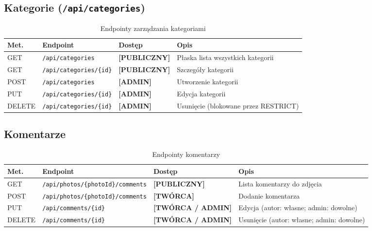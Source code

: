 \documentclass[12pt, a4paper]{article}
\begin{document}
\subsection{Kategorie (\texttt{/api/categories})}

\begin{table}[H]
  \centering
  \caption{Endpointy zarządzania kategoriami}
  \begin{tabular}{@{}L{1.5cm}L{5cm}L{2.5cm}L{5cm}@{}}
    \toprule
    \textbf{Met.} & \textbf{Endpoint} & \textbf{Dostęp} & \textbf{Opis} \\
    \midrule
    GET    & \texttt{/api/categories}        & \textbf{[PUBLICZNY]} & Płaska lista wszystkich kategorii \\
    GET    & \texttt{/api/categories/\{id\}} & \textbf{[PUBLICZNY]} & Szczegóły kategorii \\
    POST   & \texttt{/api/categories}        & \textbf{[ADMIN]}     & Utworzenie kategorii \\
    PUT    & \texttt{/api/categories/\{id\}} & \textbf{[ADMIN]}     & Edycja kategorii \\
    DELETE & \texttt{/api/categories/\{id\}} & \textbf{[ADMIN]}     & Usunięcie (blokowane przez RESTRICT) \\
    \bottomrule
  \end{tabular}
\end{table}

\subsection{Komentarze}

\begin{table}[H]
  \centering
  \caption{Endpointy komentarzy}
  \begin{tabular}{@{}L{1.5cm}L{5.5cm}L{2.5cm}L{4.5cm}@{}}
    \toprule
    \textbf{Met.} & \textbf{Endpoint} & \textbf{Dostęp} & \textbf{Opis} \\
    \midrule
    GET    & \texttt{/api/photos/\{photoId\}/comments} & \textbf{[PUBLICZNY]}      & Lista komentarzy do zdjęcia \\
    POST   & \texttt{/api/photos/\{photoId\}/comments} & \textbf{[TWÓRCA]}         & Dodanie komentarza \\
    PUT    & \texttt{/api/comments/\{id\}}             & \textbf{[TWÓRCA / ADMIN]} & Edycja (autor: własne; admin: dowolne) \\
    DELETE & \texttt{/api/comments/\{id\}}             & \textbf{[TWÓRCA / ADMIN]} & Usunięcie (autor: własne; admin: dowolne) \\
    \bottomrule
  \end{tabular}
\end{table}
\end{document}
